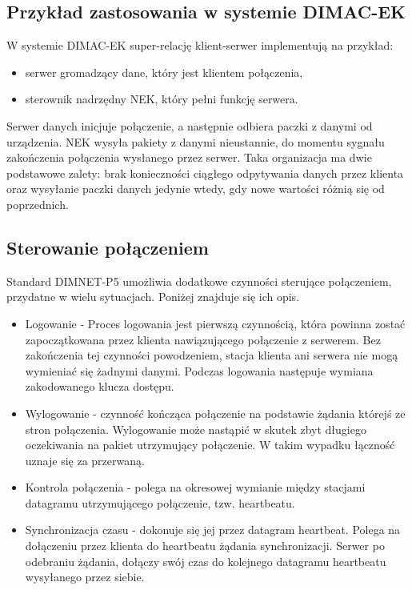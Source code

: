 \subsection{Przykład zastosowania w systemie DIMAC-EK}
W systemie DIMAC-EK super-relację klient-serwer implementują na przykład\cite{dimacek-wytyczne}:
\begin{itemize}
\item serwer gromadzący dane, który jest klientem połączenia,
\item sterownik nadrzędny NEK, który pełni funkcję serwera.
\end{itemize} 
Serwer danych inicjuje połączenie, a następnie odbiera paczki z danymi od urządzenia. NEK wysyła pakiety z danymi nieustannie, do momentu sygnału zakończenia połączenia wysłanego przez serwer. Taka organizacja ma dwie podstawowe zalety: brak konieczności ciągłego odpytywania danych przez klienta oraz wysyłanie paczki danych jedynie wtedy, gdy nowe wartości różnią się od poprzednich.

\subsection{Sterowanie połączeniem}
Standard DIMNET-P5 umożliwia dodatkowe czynności sterujące połączeniem, przydatne w wielu sytuacjach. Poniżej znajduje się ich opis.
\begin{itemize}
\item Logowanie - Proces logowania jest pierwszą czynnością, która powinna zostać zapoczątkowana przez klienta nawiązującego połączenie z serwerem. Bez zakończenia tej czynności powodzeniem, stacja klienta ani serwera nie mogą wymieniać się żadnymi danymi. Podczas logowania następuje wymiana zakodowanego klucza dostępu.
\item Wylogowanie - czynność kończąca połączenie na podstawie żądania którejś ze stron połączenia. Wylogowanie może nastąpić w skutek zbyt długiego oczekiwania na pakiet utrzymujący połączenie. W takim wypadku łączność uznaje się za przerwaną.
\item Kontrola połączenia - polega na okresowej wymianie między stacjami datagramu utrzymującego połączenie, tzw. heartbeatu.
\item Synchronizacja czasu - dokonuje się jej przez datagram heartbeat. Polega na dołączeniu przez klienta do heartbeatu żądania synchronizacji. Serwer po odebraniu żądania, dołączy swój czas do kolejnego datagramu heartbeatu wysyłanego przez siebie.
\end{itemize}


